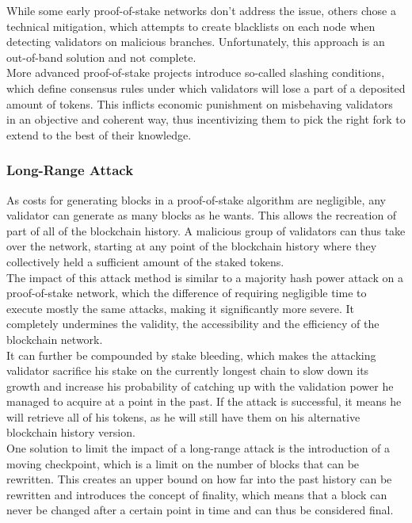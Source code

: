 \documentclass[11pt,a4paper]{article}
\begin{document}
While some early proof-of-stake networks don't address the issue, others chose a technical mitigation, which attempts to create blacklists on each node when detecting validators on malicious branches. Unfortunately, this approach is an out-of-band solution and not complete.\\

More advanced proof-of-stake projects introduce so-called slashing conditions,  which define consensus rules under which validators will lose a part of a deposited amount of tokens. This inflicts economic punishment on misbehaving validators in an objective and coherent way, thus incentivizing them to pick the right fork to extend to the best of their knowledge.\\

\subsubsection{Long-Range Attack}

As costs for generating blocks in a proof-of-stake algorithm are negligible, any validator can generate as many blocks as he wants. This allows the recreation of part of all of the blockchain history. A malicious group of validators can thus take over the network, starting at any point of the blockchain history where they collectively held a sufficient amount of the staked tokens.\\

The impact of this attack method is similar to a majority hash power attack on a proof-of-stake network, which the difference of requiring negligible time to execute mostly the same attacks, making it significantly more severe. It completely undermines the validity, the accessibility and the efficiency of the blockchain network.\\

It can further be compounded by stake bleeding, which makes the attacking validator sacrifice his stake on the currently longest chain to slow down its growth and increase his probability of catching up with the validation power he managed to acquire at a point in the past. If the attack is successful, it means he will retrieve all of his tokens, as he will still have them on his alternative blockchain history version.\\

One solution to limit the impact of a long-range attack is the introduction of a moving checkpoint, which is a limit on the number of blocks that can be rewritten. This creates an upper bound on how far into the past history can be rewritten and introduces the concept of finality, which means that a block can never be changed after a certain point in time and can thus be considered final.\\
\end{document}
